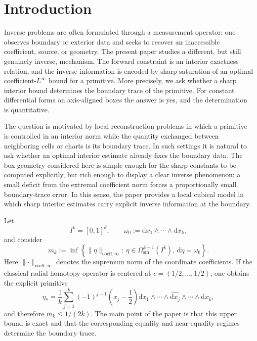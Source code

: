 \documentclass[11pt,letterpaper]{article}
\numberwithin{equation}{section}
\theoremstyle{plain}
\theoremstyle{definition}
\theoremstyle{remark}
\newcommand{\dd}{\mathrm{d}}
\newcommand{\norm}[1]{\lVert #1 \rVert}
\newcommand{\coeff}{\mathrm{coeff}}
\begin{document}
\section{Introduction}

Inverse problems are often formulated through a measurement operator: one
observes boundary or exterior data and seeks to recover an inaccessible
coefficient, source, or geometry. The present paper studies a different, but
still genuinely inverse, mechanism. The forward constraint is an interior
exactness relation, and the inverse information is encoded by sharp saturation
of an optimal coefficient-$L^\infty$ bound for a primitive. More precisely, we
ask whether a sharp interior bound determines the boundary trace of the
primitive. For constant differential forms on axis-aligned boxes the answer is
yes, and the determination is quantitative.

The question is motivated by local reconstruction problems in which a
primitive is controlled in an interior norm while the quantity exchanged
between neighboring cells or charts is its boundary trace. In such settings it
is natural to ask whether an optimal interior estimate already fixes the
boundary data. The box geometry considered here is simple enough for the sharp
constants to be computed explicitly, but rich enough to display a clear
inverse phenomenon: a small deficit from the extremal coefficient norm forces
a proportionally small boundary-trace error. In this sense, the paper provides
a local cubical model in which sharp interior estimates carry explicit inverse
information at the boundary.

Let
\[
I^k=[0,1]^k,
\qquad
\omega_0:=\dd x_1\wedge\cdots\wedge \dd x_k,
\]
and consider
\begin{equation}
\label{eq:intro-extremal-problem}
m_k:=
\inf\left\{
\norm{\eta}_{\coeff,\infty}:\ \eta\in\Omega^{k-1}_{\mathrm{sm}}(I^k),\
\dd\eta=\omega_0
\right\}.
\end{equation}
Here $\norm{\cdot}_{\coeff,\infty}$ denotes the supremum norm of the coordinate
coefficients. If the classical radial homotopy operator is centered at
$c=(1/2,\dots,1/2)$, one obtains the explicit primitive
\begin{equation}
\label{eq:intro-explicit-minimizer}
\eta_\ast
=
\frac{1}{k}\sum_{j=1}^k (-1)^{j-1}\left(x_j-\frac12\right)
\dd x_1\wedge\cdots\wedge\widehat{\dd x_j}\wedge\cdots\wedge \dd x_k,
\end{equation}
and therefore $m_k\le 1/(2k)$. The main point of the paper is that this upper
bound is exact and that the corresponding equality and near-equality regimes
determine the boundary trace.
\end{document}
